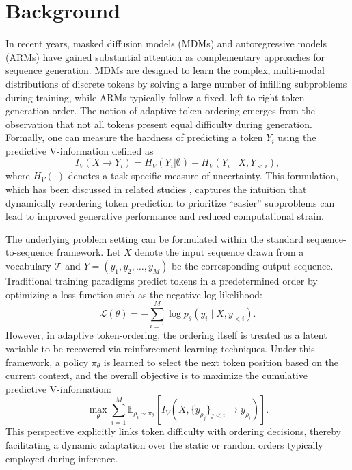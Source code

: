 \documentclass{article} %
\begin{document}
\section{Background}
In recent years, masked diffusion models (MDMs) and autoregressive models (ARMs) have gained substantial attention as complementary approaches for sequence generation. MDMs are designed to learn the complex, multi-modal distributions of discrete tokens by solving a large number of infilling subproblems during training, while ARMs typically follow a fixed, left-to-right token generation order. The notion of adaptive token ordering emerges from the observation that not all tokens present equal difficulty during generation. Formally, one can measure the hardness of predicting a token \( Y_i \) using the predictive V-information defined as 
\[
I_V(X \to Y_i) = H_V(Y_i|\emptyset) - H_V(Y_i \mid X, Y_{<i}),
\]
where \( H_V(\cdot) \) denotes a task-specific measure of uncertainty. This formulation, which has been discussed in related studies \citep{kim2025train, nie2024scaling}, captures the intuition that dynamically reordering token prediction to prioritize “easier” subproblems can lead to improved generative performance and reduced computational strain.

The underlying problem setting can be formulated within the standard sequence-to-sequence framework. Let \( X \) denote the input sequence drawn from a vocabulary \( \mathcal{T} \) and \( Y = (y_1, y_2, \dots, y_M) \) be the corresponding output sequence. Traditional training paradigms predict tokens in a predetermined order by optimizing a loss function such as the negative log-likelihood:
\[
\mathcal{L}(\theta) = -\sum_{i=1}^{M} \log p_\theta(y_i \mid X, y_{<i}).
\]
However, in adaptive token-ordering, the ordering itself is treated as a latent variable to be recovered via reinforcement learning techniques. Under this framework, a policy \( \pi_\theta \) is learned to select the next token position based on the current context, and the overall objective is to maximize the cumulative predictive V-information:
\[
\max_{\theta} \sum_{i=1}^{M} \mathbb{E}_{\rho_i \sim \pi_\theta}\left[ I_V\left(X, \{y_{\rho_j}\}_{j<i} \to y_{\rho_i}\right) \right].
\]
This perspective explicitly links token difficulty with ordering decisions, thereby facilitating a dynamic adaptation over the static or random orders typically employed during inference.
\end{document}
